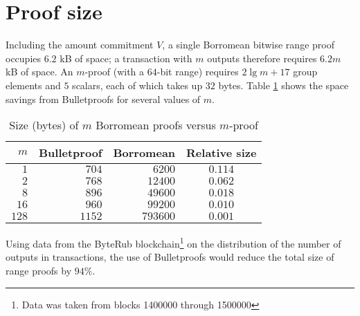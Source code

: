 \documentclass{mrl}
\begin{document}
\section{Proof size}
Including the amount commitment $V$, a single Borromean bitwise range proof occupies $6.2$ kB of space; a transaction with $m$ outputs therefore requires $6.2m$ kB of space. An $m$-proof (with a $64$-bit range) requires $2\lg m + 17$ group elements and $5$ scalars, each of which takes up $32$ bytes. Table \ref{table:size} shows the space savings from Bulletproofs for several values of $m$.

\begin{table}[h]
\begin{center}
\begin{tabular}{r|rr|c}
$m$ & Bulletproof & Borromean & Relative size \\
\hline
$1$   & $704$  & $6200$   & $0.114$ \\
$2$   & $768$  & $12400$  & $0.062$ \\
$8$   & $896$  & $49600$  & $0.018$ \\
$16$  & $960$  & $99200$  & $0.010$ \\
$128$ & $1152$ & $793600$ & $0.001$
\end{tabular}
\caption{Size (bytes) of $m$ Borromean proofs versus $m$-proof}
\label{table:size}
\end{center}
\end{table}

Using data from the ByteRub blockchain\footnote{Data was taken from blocks 1400000 through 1500000} on the distribution of the number of outputs in transactions, the use of Bulletproofs would reduce the total size of range proofs by $94\%$.



\end{document}
